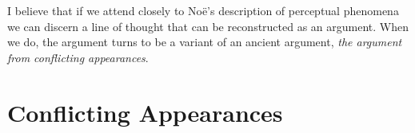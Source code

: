 \documentclass[12pt]{article}
\begin{document}
I believe that if we attend closely to Noë's description of perceptual phenomena we can discern a line of thought that can be reconstructed as an argument. When we do, the argument turns to be a variant of an ancient argument, \emph{the argument from conflicting appearances}.


\section{Conflicting Appearances}\label{sec:conflicting_appearances} %




 
 
\end{document}

